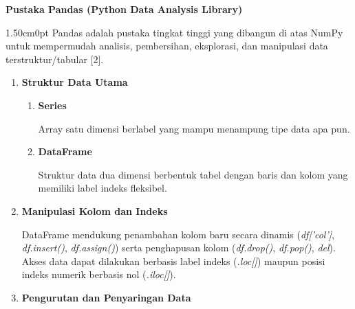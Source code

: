 \documentclass[12pt,a4paper]{article}
\begin{document}
\vspace{0.25cm}
{}
\noindent\hspace*{0.75cm}\textbf{\normalsize Pustaka Pandas (Python Data Analysis Library)}\par
\vspace{0.12cm}

\begin{adjustwidth}{1.50cm}{0pt}
\hspace*{0.85cm}Pandas adalah pustaka tingkat tinggi yang dibangun di atas NumPy untuk mempermudah analisis, pembersihan, eksplorasi, dan manipulasi data terstruktur/tabular [2].
\end{adjustwidth}

\begin{enumerate}[label=\alph*., leftmargin=2.25cm, labelwidth=0.75cm, labelsep=0cm, align=left]
    \item \textbf{Struktur Data Utama}
    \begin{enumerate}[label=\arabic*), leftmargin=0.75cm, labelwidth=0.75cm, labelsep=0cm, align=left]
        \item \textbf{Series}
        
        \hspace*{0.85cm}Array satu dimensi berlabel yang mampu menampung tipe data apa pun.
        
        \item \textbf{DataFrame}
        
        \hspace*{0.85cm}Struktur data dua dimensi berbentuk tabel dengan baris dan kolom yang memiliki label indeks fleksibel.
    \end{enumerate}
    
    \item \textbf{Manipulasi Kolom dan Indeks}
    
    \hspace*{0.85cm}DataFrame mendukung penambahan kolom baru secara dinamis (\textit{df['col']}, \textit{df.insert()}, \textit{df.assign()}) serta penghapusan kolom (\textit{df.drop()}, \textit{df.pop()}, \textit{del}). Akses data dapat dilakukan berbasis label indeks (\textit{.loc[]}) maupun posisi indeks numerik berbasis nol (\textit{.iloc[]}).

    \item \textbf{Pengurutan dan Penyaringan Data}
    

\end{enumerate}
\end{document}
